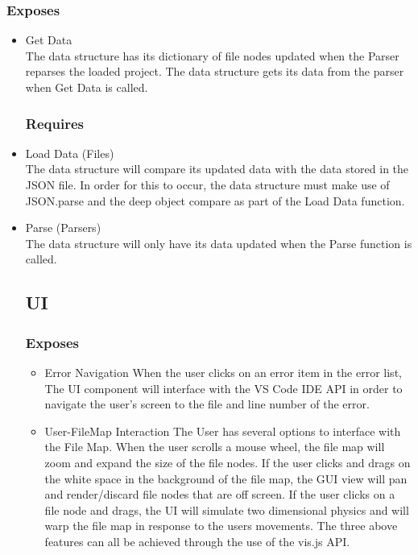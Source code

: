 \documentclass[letterpaper,10pt,titlepage,draftclsnofoot,onecolumn,onesided] {IEEEtran}
\begin{document}
		\subsubsection{Exposes}
		\begin{itemize}
			\item Get Data
			\\
			The data structure has its dictionary of file nodes updated when the Parser reparses the loaded project. 
			The data structure gets its data from the parser when Get Data is called.
		\subsubsection{Requires}
			\item Load Data (Files)
			\\
			The data structure will compare its updated data with the data stored in the JSON file. 
			In order for this to occur, the data structure must make use of JSON.parse and the deep object compare as part of the Load Data function. \cite{stringify}
			\item Parse (Parsers)
			\\
			The data structure will only have its data updated when the Parse function is called.

	\subsection{UI}
		\subsubsection{Exposes}
		\begin{itemize}
			\item Error Navigation 
			When the user clicks on an error item in the error list, The UI component will interface with the VS Code IDE API in order to navigate the user's screen to the file and line number of the error.
			\item User-FileMap Interaction
			The User has several options to interface with the File Map. 
			When the user scrolls a mouse wheel, the file map will zoom and expand the size of the file nodes.
			If the user clicks and drags on the white space in the background of the file map, the GUI view will pan and render/discard file nodes that are off screen.
			If the user clicks on a file node and drags, the UI will simulate two dimensional physics and will warp the file map in response to the users movements.
			The three above features can all be achieved through the use of the vis.js API.
		\end{itemize}
		

\end{itemize}
\end{document}
